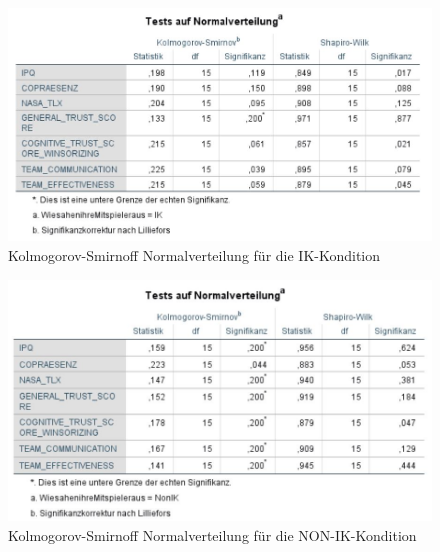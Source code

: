 \documentclass[a4paper,11pt]{article}%
\renewcommand{\\}{\vspace*{0.5\baselineskip} \newline}
\begin{document}
	\begin{figure}[H]
		\begin{footnotesize}
			\includegraphics[width=\textwidth]{Abbildungen/Post_QuestionnaireStatistiks/Normalverteilung_15_IK}\\
			\caption{Kolmogorov-Smirnoff Normalverteilung für die IK-Kondition}
			\label{fig:KolSmirIndIK}
		\end{footnotesize}
	\end{figure}	
	
	\begin{figure}[H]
		\begin{footnotesize}
			\includegraphics[width=\textwidth]{Abbildungen/Post_QuestionnaireStatistiks/Normalverteilung_15_NON_IK}\\
			\caption{Kolmogorov-Smirnoff Normalverteilung für die NON-IK-Kondition}
			\label{fig:KolSmirIndNONIK}
		\end{footnotesize}
	\end{figure}	
	
\end{document}
